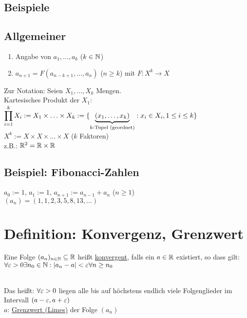 \subsection*{Beispiele}

\subsection*{Allgemeiner}
\begin{enumerate}[label=(\Roman*')]
\item Angabe von $a_1 , \hdots , a_k$ ($k \in \mathbb{N}$)
\item $a_{n+1} = F(a_{n-k+1} , \hdots , a_n)$ ($n \ge k$) mit $F: X^k \to X$
\end{enumerate}
Zur Notation: Seien $X_1 , \hdots , X_k$ Mengen.\\
Kartesisches Produkt der $X_1$:\\
$\displaystyle\prod_{i=1}^k X_i := X_1 \times \hdots \times X_k := \{\underbrace{(x_1 , \hdots , x_k)}_{k \text{-Tupel (geordnet)}} : x_i \in X_i , 1 \le i \le k \}$\\
$X^k := X \times X \times \hdots \times X$ ($k$ Faktoren)\\
z.B.: $\mathbb{R}^2 = \mathbb{R} \times \mathbb{R}$

\subsection*{Beispiel: Fibonacci-Zahlen}\label{Fibonacci}
$a_0 := 1$, $a_1 := 1$, $a_{n+1} := a_{n-1} + a_n$ ($n \ge 1$)\\
$(a_n) = (1,1,2,3,5,8,13,\hdots)$

\section{Definition: Konvergenz, Grenzwert}\label{5.2}
Eine Folge $(a_n)_{n \in \mathbb{N}} \subseteq \mathbb{R}$ heißt \underline{konvergent}, falls ein $a \in \mathbb{R}$ existiert, so dass gilt:\\
$\forall \varepsilon > 0 \exists n_0 \in \mathbb{N} : |a_n - a| < \varepsilon \forall n \ge n_0$\nl
{}\\
Das heißt: $\forall \varepsilon > 0$ liegen alle bis auf höchstens endlich viele Folgenglieder im Intervall $(a-\varepsilon, a+\varepsilon)$\\
$a$: \underline{Grenzwert (Limes)} der Folge $(a_n)$

